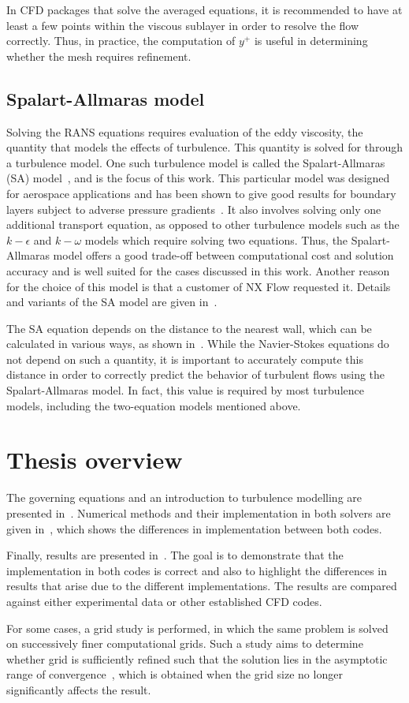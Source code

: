 In CFD packages that solve the averaged equations, it is recommended to have at least a few points within the viscous sublayer in order to resolve the flow correctly. Thus, in practice, the computation of $y^+$ is useful in determining whether the mesh requires refinement.
%
%
\subsection{Spalart-Allmaras model}
\label{sec:introsa}
%
%
Solving the RANS equations requires evaluation of the eddy viscosity, the quantity that models the effects of turbulence. This quantity is solved for through a turbulence model. One such turbulence model is called the Spalart-Allmaras (SA) model~\cite{spalart1994one}, and is the focus of this work. This particular model was designed for aerospace applications and has been shown to give good results for boundary layers subject to adverse pressure gradients~\cite{spalart1994one}. It also involves solving only one additional transport equation, as opposed to other turbulence models such as the $k-\epsilon$ and $k-\omega$ models which require solving two equations. Thus, the Spalart-Allmaras model offers a good trade-off between computational cost and solution accuracy and is well suited for the cases discussed in this work. Another reason for the choice of this model is that a customer of NX Flow requested it. Details and variants of the SA model are given in~.

The SA equation depends on the distance to the nearest wall, which can be calculated in various ways, as shown in~. While the Navier-Stokes equations do not depend on such a quantity, it is important to accurately compute this distance in order to correctly predict the behavior of turbulent flows using the Spalart-Allmaras model. In fact, this value is required by most turbulence models, including the two-equation models mentioned above.

\section{Thesis overview}
The governing equations and an introduction to turbulence modelling are presented in~. Numerical methods and their implementation in both solvers are given in~, which shows the differences in implementation between both codes. 

Finally, results are presented in~. The goal is to demonstrate that the implementation in both codes is correct and also to highlight the differences in results that arise due to the different implementations. The results are compared against either experimental data or other established CFD codes. 

For some cases, a grid study is performed, in which the same problem is solved on successively finer computational grids. Such a study aims to determine whether grid is sufficiently refined such that the solution lies in the asymptotic range of convergence~\cite{roache1986editorial}, which is obtained when the grid size no longer significantly affects the result.

